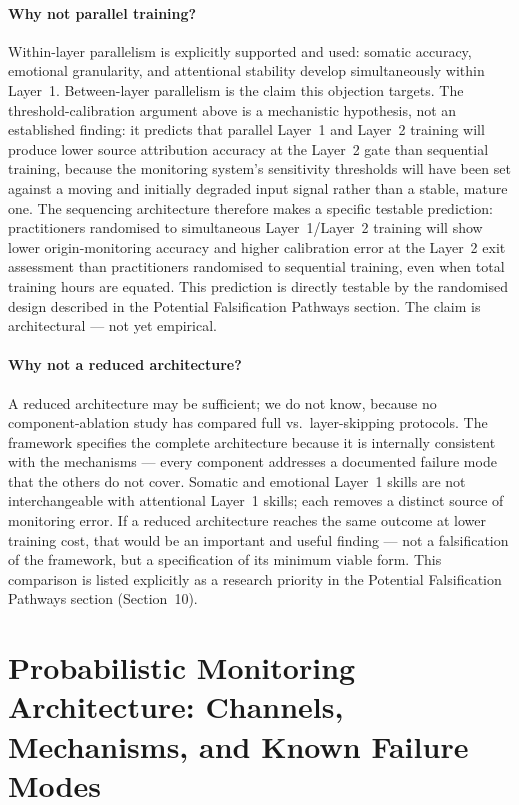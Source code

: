 \documentclass[12pt, a4paper]{article}
\begin{document}
\paragraph{Why not parallel training?}
Within-layer parallelism is explicitly supported and used: somatic accuracy,
emotional granularity, and attentional stability develop simultaneously within
Layer~1. Between-layer parallelism is the claim this objection targets. The
threshold-calibration argument above is a mechanistic hypothesis, not an
established finding: it predicts that parallel Layer~1 and Layer~2 training
will produce lower source attribution accuracy at the Layer~2 gate than
sequential training, because the monitoring system's sensitivity thresholds
will have been set against a moving and initially degraded input signal rather
than a stable, mature one. The sequencing architecture therefore makes a
specific testable prediction: practitioners randomised to simultaneous
Layer~1/Layer~2 training will show lower origin-monitoring accuracy and higher
calibration error at the Layer~2 exit assessment than practitioners randomised
to sequential training, even when total training hours are equated. This
prediction is directly testable by the randomised design described in the
Potential Falsification Pathways section. The claim is architectural --- not
yet empirical.

\paragraph{Why not a reduced architecture?}
A reduced architecture may be sufficient; we do not know, because no
component-ablation study has compared full vs.\ layer-skipping protocols.
The framework specifies the complete architecture because it is internally
consistent with the mechanisms --- every component addresses a documented
failure mode that the others do not cover. Somatic and emotional Layer~1
skills are not interchangeable with attentional Layer~1 skills; each removes
a distinct source of monitoring error. If a reduced architecture reaches the
same outcome at lower training cost, that would be an important and useful
finding --- not a falsification of the framework, but a specification of its
minimum viable form. This comparison is listed explicitly as a research
priority in the Potential Falsification Pathways section (Section~10).

\section{Probabilistic Monitoring Architecture: Channels, Mechanisms, and Known Failure Modes}
\end{document}
